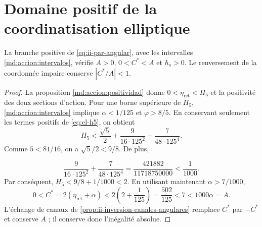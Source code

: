 \section{Domaine positif de la coordinatisation elliptique}
\begin{proposition}
\label{iv:ellipse:pertenencia}
La branche positive de \eqref{eq:ii-par-angular}, avec les
intervalles \eqref{md:accion:intervalos}, vérifie
\(A>0\), \(0<C^*<A\) et \(\hbar_s>0\).
Le renversement de la coordonnée impaire conserve \(|C^*/A|<1\).
\end{proposition}
\begin{proof}
La proposition \ref{md:accion:positividad} donne
\(0<\eta_{\mathrm{ret}}<H_5\) et la positivité des deux
sections d’action. Pour une borne supérieure de \(H_5\),
\eqref{md:accion:intervalos} implique
\(\alpha<1/125\) et \(\varphi>8/5\). En conservant seulement
les termes positifs de \eqref{eq:el-h5}, on obtient
\[
 H_5<
 \frac{\sqrt5}{2}+
 \frac{9}{16\cdot125^2}+
 \frac{7}{48\cdot125^4}.
\]
Comme \(5<81/16\), on a \(\sqrt5/2<9/8\). De plus,

\[
 \frac{9}{16\cdot125^2}+
 \frac{7}{48\cdot125^4}
 =\frac{421882}{11718750000}<\frac1{1000}.
\]
Par conséquent, \(H_5<9/8+1/1000<2\). En utilisant maintenant
\(\alpha>7/1000\),
\[
 0<C^*=2(\eta_{\mathrm{ret}}+\alpha)
 <2\left(2+\frac1{125}\right)=\frac{502}{125}
 <7<1000\alpha=A.
\]
L’échange de canaux de
\ref{prop:ii-inversion-canales-angulares} remplace \(C^*\) par \(-C^*\)
et conserve \(A\) ; il conserve donc l’inégalité absolue.

\end{proof}
